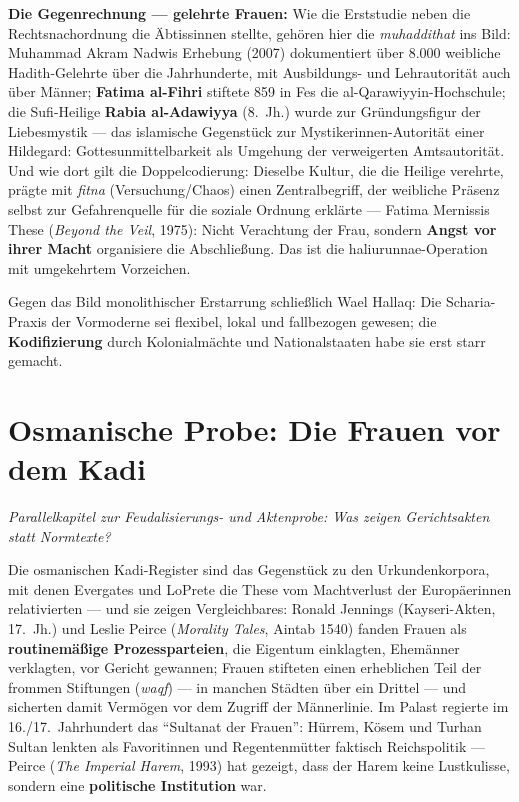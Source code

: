 \documentclass[11pt,a4paper,ngerman]{scrartcl}
\newcommand{\chipbase}[2]{\hspace{0pt}{\footnotesize\textcolor{#1}{[\textsc{#2}]}}}
\newcommand{\chipbelegt}[1]{\chipbase{chipgreen}{#1}}
\newcommand{\chipplausibel}[1]{\chipbase{chipamber}{#1}}
\newcommand{\chipumstritten}[1]{\chipbase{chipred}{#1}}
\begin{document}
\textbf{Die Gegenrechnung --- gelehrte Frauen:} Wie die Erststudie neben die Rechtsnachordnung die Äbtissinnen stellte, gehören hier die \emph{muhaddithat} ins Bild: Muhammad Akram Nadwis Erhebung (2007) dokumentiert über 8.000 weibliche Hadith-Gelehrte über die Jahrhunderte, mit Ausbildungs- und Lehrautorität auch über Männer; \textbf{Fatima al-Fihri} stiftete 859 in Fes die al-Qarawiyyin-Hochschule; die Sufi-Heilige \textbf{Rabia al-Adawiyya} (8.~Jh.) wurde zur Gründungsfigur der Liebesmystik --- das islamische Gegenstück zur Mystikerinnen-Autorität einer Hildegard: Gottesunmittelbarkeit als Umgehung der verweigerten Amtsautorität. \chipbelegt{belegt} Und wie dort gilt die Doppelcodierung: Dieselbe Kultur, die die Heilige verehrte, prägte mit \emph{fitna} (Versuchung/Chaos) einen Zentralbegriff, der weibliche Präsenz selbst zur Gefahrenquelle für die soziale Ordnung erklärte --- Fatima Mernissis These (\emph{Beyond the Veil}, 1975): Nicht Verachtung der Frau, sondern \textbf{Angst vor ihrer Macht} organisiere die Abschließung. Das ist die haliurunnae-Operation mit umgekehrtem Vorzeichen. \chipplausibel{plausibel}

Gegen das Bild monolithischer Erstarrung schließlich Wael Hallaq: Die Scharia-Praxis der Vormoderne sei flexibel, lokal und fallbezogen gewesen; die \textbf{Kodifizierung} durch Kolonialmächte und Nationalstaaten habe sie erst starr gemacht. \chipumstritten{umstritten}

\section{Osmanische Probe: Die Frauen vor dem Kadi}
\noindent\textit{Parallelkapitel zur Feudalisierungs- und Aktenprobe: Was zeigen Gerichtsakten statt Normtexte?}
\medskip

Die osmanischen Kadi-Register sind das Gegenstück zu den Urkundenkorpora, mit denen Evergates und LoPrete die These vom Machtverlust der Europäerinnen relativierten --- und sie zeigen Vergleichbares: Ronald Jennings (Kayseri-Akten, 17.~Jh.) und Leslie Peirce (\emph{Morality Tales}, Aintab 1540) fanden Frauen als \textbf{routinemäßige Prozessparteien}, die Eigentum einklagten, Ehemänner verklagten, vor Gericht gewannen; Frauen stifteten einen erheblichen Teil der frommen Stiftungen (\emph{waqf}) --- in manchen Städten über ein Drittel --- und sicherten damit Vermögen vor dem Zugriff der Männerlinie. Im Palast regierte im 16./17.~Jahrhundert das \enquote{Sultanat der Frauen}: Hürrem, Kösem und Turhan Sultan lenkten als Favoritinnen und Regentenmütter faktisch Reichspolitik --- Peirce (\emph{The Imperial Harem}, 1993) hat gezeigt, dass der Harem keine Lustkulisse, sondern eine \textbf{politische Institution} war. \chipbelegt{belegt}
\end{document}
